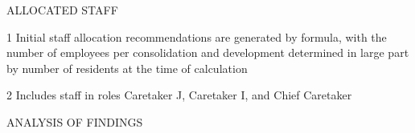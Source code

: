\pagebreak
\textcolor{ccfuschia}{ALLOCATED STAFF}

\begin{table}[H]
\begin{threeparttable}



\begin{tablenotes}
\small
\item [1] Initial staff allocation recommendations are generated by formula, with the number of employees per consolidation and development determined in large part by number of residents at the time of calculation
\item [2] Includes staff in roles Caretaker J, Caretaker I, and Chief Caretaker
\end{tablenotes}
\end{threeparttable}
\end{table}
\pagebreak
\pagestyle{plain}
\whitetext{\Chapter{\textcolor{ccgreen}{Analysis}}}
\pagecolor{ccgreen}
\pagestyle{plain}

\pagebreak
{}
\pagestyle{fancy}
\fancyhf{}
\renewcommand{\chaptermark}[1]{\markboth{#1}{}}
\fancyfoot[LE,RO]{\sffamily\thepage}
\textcolor{ccgreen}{ANALYSIS OF FINDINGS}
\\


\pagestyle{plain}
\whitetext{\Chapter{\textcolor{lightBlue}{Appendices}}}
\pagecolor{lightBlue}
\pagestyle{plain}

\pagebreak
\pagestyle{fancy}
\fancyhf{}
\renewcommand{\chaptermark}[1]{\markboth{#1}{}}
\fancyfoot[LE,RO]{\thepage}
\nopagecolor
{}


